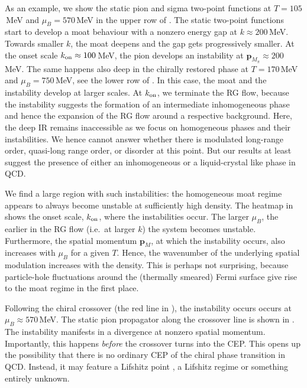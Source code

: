 \documentclass[10pt,prd,superscriptaddress,twocolumn]{revtex4-2}
\begin{document}
As an example, we show the static pion and sigma two-point functions at $T = 105$\,MeV and $\mu_B=570$\,MeV in the upper row of . The static two-point functions start to develop a moat behaviour with a nonzero energy gap at $k\approx 200$\,MeV. Towards smaller $k$, the moat deepens and the gap gets progressively smaller. At the onset scale $k_{\rm on}\approx 100$\,MeV, the pion develops an instability at $\boldsymbol{p}_{M_\pi} \approx 200$\,MeV. 
The same happens also deep in the chirally restored phase at $T = 170$\,MeV and $\mu_B=750$\,MeV, see the lower row of . In this case, the moat and the instability develop at larger scales. 
At $k_{\rm on}$, we terminate the RG flow, because the instability suggests the formation of an intermediate inhomogeneous phase and hence the expansion of the RG flow around a respective background. Here, the deep IR remains inaccessible as we focus on homogeneous phases and their instabilities. We hence cannot answer whether there is modulated long-range order, quasi-long range order, or disorder at this point. But our results at least suggest the presence of either an inhomogeneous or a liquid-crystal like phase in QCD. 


We find a large region with such instabilities: the homogeneous moat regime appears to always become unstable at sufficiently high density.
The heatmap in  shows the onset scale, $k_{\rm on}$, where the instabilities occur. The larger $\mu_B$, the earlier in the RG flow (i.e.~at larger $k$) the system becomes unstable. Furthermore, the spatial momentum $\boldsymbol{p}_M$, at which the instability occurs, also increases with $\mu_B$ for a given $T$. Hence, the wavenumber of the underlying spatial modulation increases with the density. This is perhaps not surprising, because particle-hole fluctuations around the (thermally smeared) Fermi surface give rise to the moat regime in the first place.    

Following the chiral crossover (the red line in ), the instability occurs occurs at $\mu_B \approx 570$\,MeV. The static pion propagator along the crossover line is shown in . The instability manifests in a divergence at nonzero spatial momentum. Importantly, this happens \emph{before} the crossover turns into the CEP. This opens up the possibility that there is no ordinary CEP of the chiral phase transition in QCD. Instead, it may feature a Lifshitz point \cite{Hornreich:1975zz, Nickel:2009ke}, a Lifshitz regime \cite{Pisarski:2018bct} or something entirely unknown.
\end{document}
